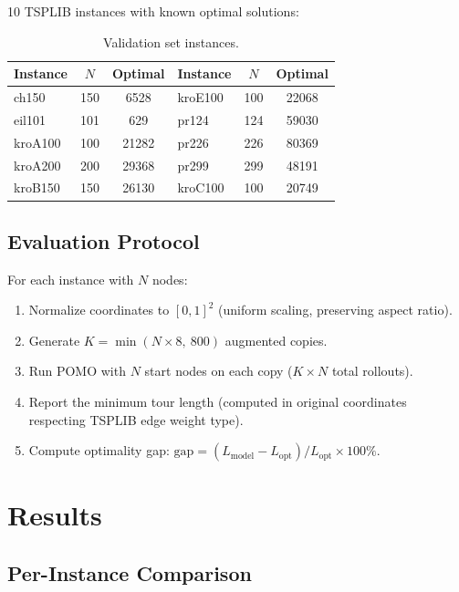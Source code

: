 \documentclass[11pt,a4paper]{article}
\begin{document}
10 TSPLIB instances with known optimal solutions:

\begin{table}[h]
\centering
\caption{Validation set instances.}
\label{tab:valset}
\small
\begin{tabular}{@{}lcclcc@{}}
\toprule
\textbf{Instance} & $N$ & \textbf{Optimal} &
\textbf{Instance} & $N$ & \textbf{Optimal} \\
\midrule
ch150 & 150 & 6528 & kroE100 & 100 & 22068 \\
eil101 & 101 & 629 & pr124 & 124 & 59030 \\
kroA100 & 100 & 21282 & pr226 & 226 & 80369 \\
kroA200 & 200 & 29368 & pr299 & 299 & 48191 \\
kroB150 & 150 & 26130 & kroC100 & 100 & 20749 \\
\bottomrule
\end{tabular}
\end{table}

\subsection{Evaluation Protocol}

For each instance with $N$ nodes:
\begin{enumerate}
  \item Normalize coordinates to $[0,1]^2$ (uniform scaling, preserving aspect ratio).
  \item Generate $K = \min(N \times 8,\ 800)$ augmented copies.
  \item Run POMO with $N$ start nodes on each copy ($K \times N$ total rollouts).
  \item Report the minimum tour length (computed in original coordinates
        respecting TSPLIB edge weight type).
  \item Compute optimality gap: $\text{gap} = (L_{\text{model}} -
        L_{\text{opt}}) / L_{\text{opt}} \times 100\%$.
\end{enumerate}

\section{Results}
\label{sec:results}

\subsection{Per-Instance Comparison}
\end{document}
